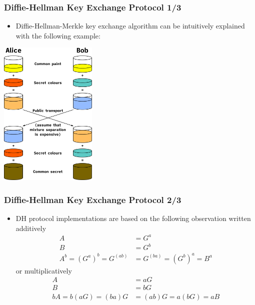 \documentclass{beamer}
\begin{document}
\begin{frame}
  \frametitle{Diffie-Hellman Key Exchange Protocol 1/3}
  \begin{itemize}
  \item Diffie-Hellman-Merkle key exchange algorithm can be intuitively
    explained with the following example:
  \end{itemize}
  \begin{center}
    \includegraphics[width=0.35\textwidth]{dh}
  \end{center}
\end{frame}

\begin{frame}
  \frametitle{Diffie-Hellman Key Exchange Protocol 2/3}
  \begin{itemize}
  \item DH protocol implementations are based on the following observation
    written additively
    \begin{align*}
      A &= G^a \\
      B &= G^b \\
      A^b = (G^a)^b = G^{(ab)} &= G^{(ba)} = (G^b)^a = B^a
    \end{align*}
    or multiplicatively
        \begin{align*}
      A &= aG \\
      B &= bG \\
      bA = b(aG) = (ba)G &= (ab)G = a(bG) = aB
    \end{align*}
  \end{itemize}
\end{frame}
\end{document}
